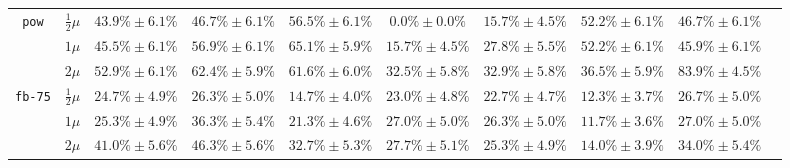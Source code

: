 \begin{table}[htpb]
{\begin{tabular}{cccccccccc}
    \midrule 
    
    \multirow{3}{*}{\texttt{pow}} 
    & $\frac{1}{2}\mu$ & $43.9\% \pm 6.1\%$ & $46.7\% \pm 6.1\%$ & $\mathbf{56.5\% \pm 6.1\%}$ & $0.0\% \pm 0.0\%$ & $15.7\% \pm 4.5\%$ & $52.2\% \pm 6.1\%$ & $46.7\% \pm 6.1\%$ \\ 
    & $1\mu$ & $45.5\% \pm 6.1\%$ & $56.9\% \pm 6.1\%$ & $\mathbf{65.1\% \pm 5.9\%}$ & $15.7\% \pm 4.5\%$ & $27.8\% \pm 5.5\%$ & $52.2\% \pm 6.1\%$ & $45.9\% \pm 6.1\%$ \\ 
    & $2\mu$ & $52.9\% \pm 6.1\%$ & $62.4\% \pm 5.9\%$ & $61.6\% \pm 6.0\%$ & $32.5\% \pm 5.8\%$ & $32.9\% \pm 5.8\%$ & $36.5\% \pm 5.9\%$ & $\mathbf{83.9\% \pm 4.5\%}$ \\ 
    
    \midrule 
    
    \multirow{3}{*}{\texttt{fb-75}} 
    & $\frac{1}{2}\mu$ & $24.7\% \pm 4.9\%$ & $26.3\% \pm 5.0\%$ & $14.7\% \pm 4.0\%$ & $23.0\% \pm 4.8\%$ & $22.7\% \pm 4.7\%$ & $12.3\% \pm 3.7\%$ & $\mathbf{26.7\% \pm 5.0\%}$ \\ 
    & $1\mu$ & $25.3\% \pm 4.9\%$ & $\mathbf{36.3\% \pm 5.4\%}$ & $21.3\% \pm 4.6\%$ & $27.0\% \pm 5.0\%$ & $26.3\% \pm 5.0\%$ & $11.7\% \pm 3.6\%$ & $27.0\% \pm 5.0\%$ \\ 
    & $2\mu$ & $41.0\% \pm 5.6\%$ & $\mathbf{46.3\% \pm 5.6\%}$ & $32.7\% \pm 5.3\%$ & $27.7\% \pm 5.1\%$ & $25.3\% \pm 4.9\%$ & $14.0\% \pm 3.9\%$ & $34.0\% \pm 5.4\%$ \\ 
    
    \bottomrule 
\end{tabular} 
} 
\end{table}

